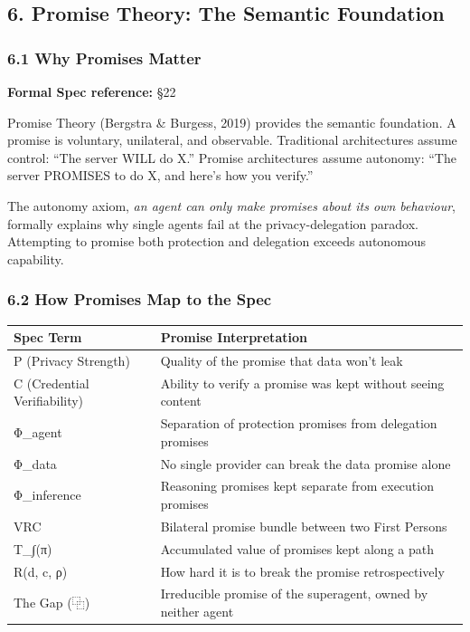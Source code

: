 \documentclass[
]{article}
\newcounter{none} %
\begin{document}
\subsection{6. Promise Theory: The Semantic
Foundation}\label{promise-theory-the-semantic-foundation}

\subsubsection{6.1 Why Promises Matter}\label{why-promises-matter}

\textbf{Formal Spec reference:} §22

Promise Theory (Bergstra \& Burgess, 2019) provides the semantic
foundation. A promise is voluntary, unilateral, and observable.
Traditional architectures assume control: ``The server WILL do X.''
Promise architectures assume autonomy: ``The server PROMISES to do X,
and here's how you verify.''

The autonomy axiom, \emph{an agent can only make promises about its own
behaviour}, formally explains why single agents fail at the
privacy-delegation paradox. Attempting to promise both protection and
delegation exceeds autonomous capability.

\subsubsection{6.2 How Promises Map to the
Spec}\label{how-promises-map-to-the-spec}

{\def\LTcaptype{none} %
\begin{longtable}[]{@{}
  >{\raggedright\arraybackslash}p{}
  >{\raggedright\arraybackslash}p{}@{}}
\toprule\noalign{}
\begin{minipage}[b]{\linewidth}\raggedright
Spec Term
\end{minipage} & \begin{minipage}[b]{\linewidth}\raggedright
Promise Interpretation
\end{minipage} \\
\midrule\noalign{}
\endhead
\bottomrule\noalign{}
\endlastfoot
P (Privacy Strength) & Quality of the promise that data won't leak \\
C (Credential Verifiability) & Ability to verify a promise was kept
without seeing content \\
Φ\_agent & Separation of protection promises from delegation promises \\
Φ\_data & No single provider can break the data promise alone \\
Φ\_inference & Reasoning promises kept separate from execution
promises \\
VRC & Bilateral promise bundle between two First Persons \\
T\_∫(π) & Accumulated value of promises kept along a path \\
R(d, c, ρ) & How hard it is to break the promise retrospectively \\
The Gap (⿻) & Irreducible promise of the superagent, owned by neither
agent \\
\end{longtable}
}
\end{document}
